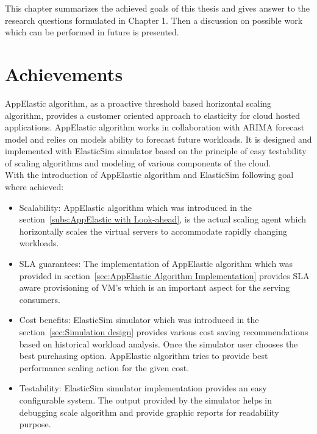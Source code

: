 This chapter summarizes the achieved goals of this thesis and gives answer to the research questions formulated in Chapter 1. Then a discussion on possible work which can be performed in future is presented.

\section{Achievements}
\label{sec:Achievements}
AppElastic algorithm, as a proactive threshold based horizontal scaling algorithm, provides a customer oriented approach to elasticity for cloud hosted applications. AppElastic algorithm works in collaboration with ARIMA forecast model and relies on models ability to forecast future workloads. It is designed and implemented with ElasticSim simulator based on the principle of easy testability of scaling algorithms and modeling of various components of the cloud.
\\
With the introduction of AppElastic algorithm and ElasticSim following goal where achieved:
\begin{itemize}
  \item Scalability: AppElastic algorithm which was introduced in the section~\ref{subs:AppElastic with Look-ahead}, is the actual scaling agent which horizontally scales the virtual servers to accommodate rapidly changing workloads.
  \item SLA guarantees: The implementation of AppElastic algorithm which was provided in section~\ref{sec:AppElastic Algorithm Implementation} provides SLA aware provisioning of VM's which is an important aspect for the serving consumers.
  \item Cost benefits: ElasticSim simulator which was introduced in the section~\ref{sec:Simulation design} provides various cost saving recommendations based on historical workload analysis. Once the simulator user chooses the best purchasing option. AppElastic algorithm tries to provide best performance scaling action for the given cost.
  \item Testability: ElasticSim simulator implementation provides an easy configurable system. The output provided by the simulator helps in debugging scale algorithm and provide graphic reports for readability purpose.
\end{itemize}

